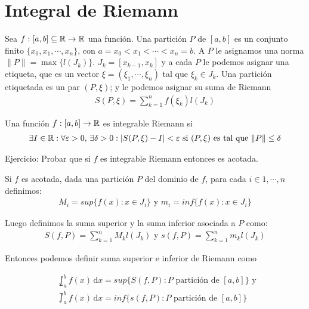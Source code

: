 \section{Integral de Riemann}

Sea $f: [a, b] \subseteq \mathbb{R} \to \mathbb{R}$ una función.
Una partición $P$ de $[a, b]$ es un conjunto finito $\{ x_0, x_1, \cdots, x_n \}$, con
$a = x_0 < x_1 < \cdots < x_n = b$. A $P$ le asignamos una norma $\| P \| = \max \{ l(J_k) \}$. $J_k = [x_{k-1}, x_k]$ y a cada $P$ le
podemos asignar una etiqueta, que es un vector $\xi = (\xi_1, \cdots, \xi_n)$ tal que $\xi_k \in J_k$. Una partición etiquetada es un par
$(P, \xi)$; y le podemos asignar su suma de Riemann \begin{align*}S(P, \xi) = \sum_{k=1}^{n} f(\xi_k) l(J_k)\end{align*}

\begin{definition}
    Una función $f: [a, b] \to \mathbb{R}$ es integrable Riemann si
    \begin{align*}
        \exists I \in \mathbb{R} : \forall \varepsilon > 0\text{, }\exists \delta > 0 : | S(P, \xi) - I | < \varepsilon \text{ si } (P, \xi) \text{ es tal que } \| P \| \leq \delta
    \end{align*}
\end{definition}

Ejercicio: Probar que si $f$ es integrable Riemann entonces es acotada.

Si $f$ es acotada, dada una partición $P$ del dominio de $f$, para cada $i \in 1, \cdots, n$ definimos:
\begin{align*}
    M_i = sup \{ f(x) : x \in J_i \} \text{ y } m_i = inf\{ f(x) : x \in J_i \}
\end{align*}

Luego definimos la suma superior y la suma inferior asociada a $P$ como:
\begin{align*}
    S(f, P) = \sum_{k=1}^{n} M_k l(J_k) \text{ y } s(f, P) = \sum_{k=1}^{n} m_k l(J_k)
\end{align*}

Entonces podemos definir suma superior e inferior de Riemann como

\begin{align*}
     & \lowint_a^b f(x) \, \mathrm{d}x = sup \{ S(f, P) : P \text{ partición de } [a, b] \} \text{ y } \\
     & \upint_a^b f(x) \, \mathrm{d}x = inf \{ s(f, P) : P \text{ partición de } [a, b] \}
\end{align*}


